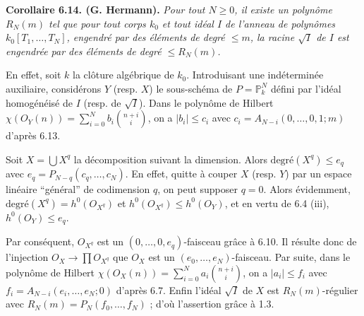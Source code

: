 
\textbf{Corollaire 6.14. (G. Hermann).} \emph{Pour tout $N\ge0$, il existe un polyn\^ome $R_N(m)$ tel que pour tout corps $k_0$ et tout id\'eal $I$ de l'anneau de polyn\^omes $k_0[T_1,\ldots,T_N]$, engendr\'e par des \'el\'ements de degr\'e $\le m$, la racine $\sqrt I$ de $I$ est engendr\'ee par des \'el\'ements de degr\'e $\le R_N(m)$.}

En effet, soit $k$ la cl\^oture alg\'ebrique de $k_0$. Introduisant une ind\'etermin\'ee auxiliaire, consid\'erons $Y$ (resp. $X$) le sous-sch\'ema de $P=\mathbb P^N_k$ d\'efini par l'id\'eal homog\'en\'eis\'e de $I$ (resp. de $\sqrt I$). Dans le polyn\^ome de Hilbert $\chi({O}_Y(n))=\sum_{i=0}^{N}b_i\binom{n+i}{i}$, on a $|b_i|\le c_i$ avec $c_i=A_{N-i}(0,\ldots,0,1;m)$ d'apr\`es 6.13.

Soit $X=\bigcup X^q$ la d\'ecomposition suivant la dimension. Alors $\text{degr\'e}(X^q)\le e_q$ avec $e_q=P_{N-q}(c_q,\ldots,c_N)$. En effet, quitte \`a couper $X$ (resp. $Y$) par un espace lin\'eaire ``g\'en\'eral'' de codimension $q$, on peut supposer $q=0$. Alors \'evidemment, $\text{degr\'e}(X^q)=h^0({O}_{X^q})$ et $h^0({O}_{X^q})\le h^0({O}_Y)$, et en vertu de 6.4 (iii), $h^0({O}_Y)\le e_q$.

Par cons\'equent, ${O}_{X^q}$ est un $(0,\ldots,0,e_q)$-faisceau gr\^ace \`a 6.10. Il r\'esulte donc de l'injection ${O}_X\to \prod{O}_{X^q}$ que ${O}_X$ est un $(e_0,\ldots,e_N)$-faisceau. Par suite, dans le polyn\^ome de Hilbert $\chi({O}_X(n))=\sum_{i=0}^{N}a_i\binom{n+i}{i}$, on a $|a_i|\le f_i$ avec $f_i=A_{N-i}(e_i,\ldots,e_N;0)$ d'apr\`es 6.7. Enfin l'id\'eal $\sqrt I$ de $X$ est $R_N(m)$-r\'egulier avec $R_N(m)=P_N(f_0,\ldots,f_N)$ ; d'o\`u l'assertion gr\^ace \`a 1.3.

